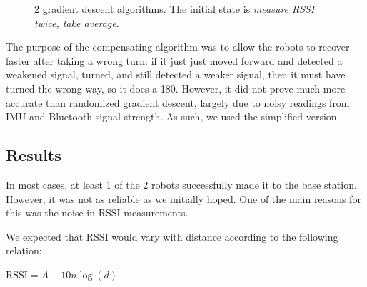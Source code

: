 \documentclass[]{article}
\begin{document}
\begin{figure}
  \centering
  \caption{2 gradient descent algorithms. The initial state is \emph{measure RSSI twice, take average}.}
  \label{fig:graddesc}
\end{figure}

The purpose of the compensating algorithm was to allow the robots to recover faster after taking a wrong turn: if it just just moved forward and detected a
weakened signal, turned, and still detected a weaker signal, then it must have turned the wrong way, so it does a 180. However, it did not prove much more accurate than randomized gradient descent, largely due to noisy readings from IMU and Bluetooth signal strength. As such, we used the simplified version.

\subsection{Results}

In most cases, at least 1 of the 2 robots successfully made it to the
base station. However, it was not as reliable as we initially hoped. One
of the main reasons for this was the noise in RSSI measurements.

We expected that RSSI would vary with distance according to the
following relation:

\(\text{RSSI} = A - 10 n \log(d)\)
\end{document}
